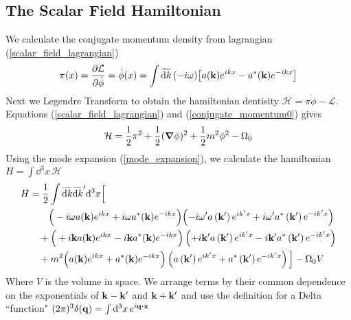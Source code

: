 \subsection{The Scalar Field Hamiltonian}
We calculate the conjugate momentum density from lagrangian (\ref{scalar_field_lagrangian})
\begin{equation}
\pi(x)=\pdv{\mathcal{L}}{\dot{\phi}}=\dot{\phi}(x)=\int \widetilde{\dd k}\,(-i\omega)\qty[a(\vb{k})e^{ikx}-a^*(\vb{k})e^{-ikx}]
\label{conjugate_momentum0}
\end{equation}
Next we Legendre Transform to obtain the hamiltonian dentisity $\mathcal{H}=\pi\dot{\phi}-\mathcal{L}$. Equations (\ref{scalar_field_lagrangian}) and (\ref{conjugate_momentum0}) gives
\begin{equation}
    \mathcal{H}=\frac{1}{2}\pi^2+\frac{1}{2}(\grad\phi)^2+\frac{1}{2}m^2\phi^2-\Omega_0
\end{equation}
Using the mode expansion (\ref{mode_expansion}), we calculate the hamiltonian $H=\int\dd^3x\,\mathcal{H}$
\begin{equation}
    \begin{aligned}
H &=\frac{1}{2} \int \widetilde{\dd k} \widetilde{\dd k}^{\prime} \dd^{3} x\Big{[}\\&\qquad\Big{(}-i \omega a(\mathbf{k}) e^{i k x}+i \omega a^{*}(\mathbf{k}) e^{-i k x}\Big{)}\qty(-i \omega^{\prime} a\left(\mathbf{k}^{\prime}\right) e^{i k^{\prime} x}+i \omega^{\prime} a^{*}\left(\mathbf{k}^{\prime}\right) e^{-i k^{\prime} x}) \\
&\quad+\Big{(}+i \mathbf{k} a(\mathbf{k}) e^{i k x}-i \mathbf{k} a^{*}(\mathbf{k}) e^{-i k x}\Big{)} \left(+i \mathbf{k}^{\prime} a\left(\mathbf{k}^{\prime}\right) e^{i k^{\prime} x}-i \mathbf{k}^{\prime} a^{*}\left(\mathbf{k}^{\prime}\right) e^{-i k^{\prime} x}\right) \\
&\quad+m^{2}\Big{(}a(\mathbf{k}) e^{i k x}+a^{*}(\mathbf{k}) e^{-i k x}\Big{)}\left(a\left(\mathbf{k}^{\prime}\right) e^{i k^{\prime} x}+a^{*}\left(\mathbf{k}^{\prime}\right) e^{-i k^{\prime} x}\right)\Big{]}-\Omega_{0} V
\end{aligned}
\end{equation}
Where $V$ is the volume in space. We arrange terms by their common dependence on the exponentials of $\vb{k}-\vb{k}^\prime$ and $\vb{k}+\vb{k}^\prime$ and use the definition for a Delta ``function" $(2\pi)^3\delta(\vb{q})=\int\dd^3x\,e^{i\vb{q}\vdot\vb{x}}$
